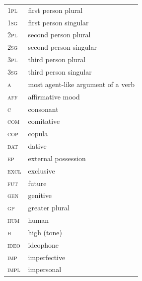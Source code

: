 \documentclass[output=paper]{langsci/langscibook}
\begin{document}
\begin{tabularx}{.45\textwidth}{lX}

\textsc{1pl}   &  first person plural \\

\textsc{1sg}  &  first person singular \\

\textsc{2pl}   &  second person plural \\

\textsc{2sg}   &  second person singular \\

\textsc{3pl}  &   third person plural \\

\textsc{3sg}  &   third person singular \\

\textsc{a}   &  most agent-like argument of a verb \\

\textsc{aff}  &   affirmative mood \\

\textsc{c}  &  consonant \\

\textsc{com}   & comitative \\

\textsc{cop}  &  copula \\

\textsc{dat}  &   dative \\

\textsc{ep}  &   external possession \\

\textsc{excl}  &   exclusive \\

\textsc{fut}  &  future \\

\textsc{gen}  &  genitive \\

\textsc{gp}  &  greater plural \\

\textsc{hum}  &  human \\

\textsc{h} &   high (tone) \\

\textsc{ideo} &   ideophone \\

\textsc{imp}  &  imperfective \\

\textsc{impl}  &  impersonal \\


\end{tabularx}
\end{document}
